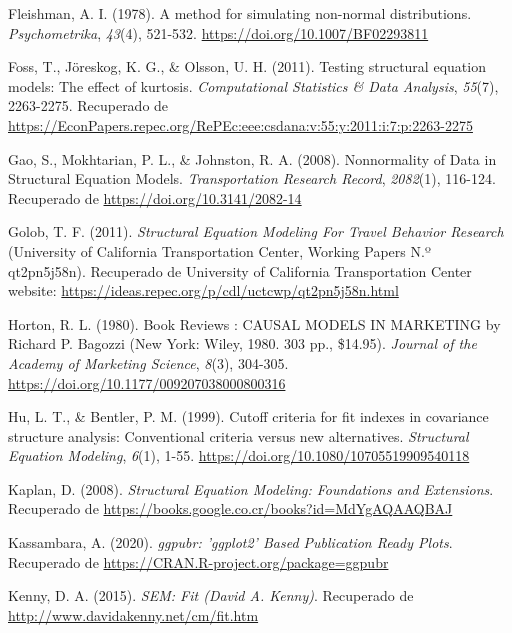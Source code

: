 \documentclass[
  english]{revcoles}
\begin{document}
\leavevmode\hypertarget{ref-Fleishman1978}{}%
Fleishman, A. I. (1978). A method for simulating non-normal
distributions. \emph{Psychometrika}, \emph{43}(4), 521-532.
\url{https://doi.org/10.1007/BF02293811}

\leavevmode\hypertarget{ref-foss}{}%
Foss, T., Jöreskog, K. G., \& Olsson, U. H. (2011). Testing structural
equation models: The effect of kurtosis. \emph{Computational Statistics
\& Data Analysis}, \emph{55}(7), 2263-2275. Recuperado de
\url{https://EconPapers.repec.org/RePEc:eee:csdana:v:55:y:2011:i:7:p:2263-2275}

\leavevmode\hypertarget{ref-gao}{}%
Gao, S., Mokhtarian, P. L., \& Johnston, R. A. (2008). Nonnormality of
Data in Structural Equation Models. \emph{Transportation Research
Record}, \emph{2082}(1), 116-124. Recuperado de
\href{\%20https://doi.org/10.3141/2082-14}{https://doi.org/10.3141/2082-14}

\leavevmode\hypertarget{ref-golob}{}%
Golob, T. F. (2011). \emph{Structural Equation Modeling For Travel
Behavior Research} (University of California Transportation Center,
Working Papers N.º qt2pn5j58n). Recuperado de University of California
Transportation Center website:
\url{https://ideas.repec.org/p/cdl/uctcwp/qt2pn5j58n.html}

\leavevmode\hypertarget{ref-bagozzi}{}%
Horton, R. L. (1980). Book Reviews : CAUSAL MODELS IN MARKETING by
Richard P. Bagozzi (New York: Wiley, 1980. 303 pp., \$14.95).
\emph{Journal of the Academy of Marketing Science}, \emph{8}(3),
304-305. \url{https://doi.org/10.1177/009207038000800316}

\leavevmode\hypertarget{ref-Hu1999}{}%
Hu, L. T., \& Bentler, P. M. (1999). Cutoff criteria for fit indexes in
covariance structure analysis: Conventional criteria versus new
alternatives. \emph{Structural Equation Modeling}, \emph{6}(1), 1-55.
\url{https://doi.org/10.1080/10705519909540118}

\leavevmode\hypertarget{ref-kaplan}{}%
Kaplan, D. (2008). \emph{Structural Equation Modeling: Foundations and
Extensions}. Recuperado de
\url{https://books.google.co.cr/books?id=MdYgAQAAQBAJ}

\leavevmode\hypertarget{ref-ggpubr}{}%
Kassambara, A. (2020). \emph{ggpubr: 'ggplot2' Based Publication Ready
Plots}. Recuperado de \url{https://CRAN.R-project.org/package=ggpubr}

\leavevmode\hypertarget{ref-Kenny2015}{}%
Kenny, D. A. (2015). \emph{SEM: Fit (David A. Kenny)}. Recuperado de
\url{http://www.davidakenny.net/cm/fit.htm}
\end{document}
